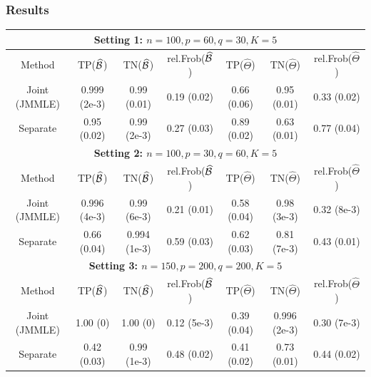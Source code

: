 \documentclass[10pt]{beamer}
\theoremstyle{definition}
\begin{document}
\begin{frame}
\frametitle{Results}

\begin{scriptsize}
\begin{table}
    \begin{tabular}{c|ccc|ccc}
    \hline
    \multicolumn{7}{c}{{\bf Setting 1: $n=100, p=60, q=30, K=5$}}\\\hline
    Method        & TP($\widehat{{\cal{B}}}$)         & TN($\widehat{{\cal{B}}}$)         & rel.Frob($\widehat{{\cal{B}}}$) & TP($\widehat\Theta$)   & TN($\widehat\Theta$)   & rel.Frob($\widehat\Theta$) \\\hline
    Joint (JMMLE) & 0.999 (2e-3) & 0.99 (0.01)   & 0.19 (0.02)  & 0.66 (0.06) & 0.95 (0.01) & 0.33 (0.02)      \\
    Separate      & 0.95 (0.02)   & 0.99  (2e-3) & 0.27 (0.03)  & 0.89 (0.02) & 0.63 (0.01) & 0.77 (0.04)      \\\hline
    \multicolumn{7}{c}{{\bf Setting 2: $n=100, p=30, q=60, K=5$}}\\\hline
    Method        & TP($\widehat{{\cal{B}}}$)         & TN($\widehat{{\cal{B}}}$)         & rel.Frob($\widehat{{\cal{B}}}$) & TP($\widehat\Theta$)   & TN($\widehat\Theta$)   & rel.Frob($\widehat\Theta$) \\\hline
    Joint (JMMLE) & 0.996 (4e-3) & 0.99 (6e-3)   & 0.21 (0.01)  & 0.58 (0.04) & 0.98 (3e-3) & 0.32 (8e-3)      \\
    Separate      & 0.66 (0.04)  & 0.994  (1e-3) & 0.59 (0.03)  & 0.62 (0.03) & 0.81 (7e-3) & 0.43 (0.01)      \\\hline
    \multicolumn{7}{c}{{\bf Setting 3: $n=150, p=200, q=200, K=5$}}\\\hline
    Method        & TP($\widehat{{\cal{B}}}$)         & TN($\widehat{{\cal{B}}}$)         & rel.Frob($\widehat{{\cal{B}}}$) & TP($\widehat\Theta$)   & TN($\widehat\Theta$)   & rel.Frob($\widehat\Theta$) \\\hline
    Joint (JMMLE) & 1.00 (0) & 1.00 (0)   & 0.12 (5e-3)  & 0.39 (0.04) & 0.996 (2e-3) & 0.30 (7e-3)      \\
    Separate      & 0.42 (0.03)   & 0.99  (1e-3) & 0.48 (0.02)  & 0.41 (0.02) & 0.73 (0.01) & 0.44 (0.02)      \\\hline
    \end{tabular}
\end{table}
\end{scriptsize}
\end{frame}
\end{document}

